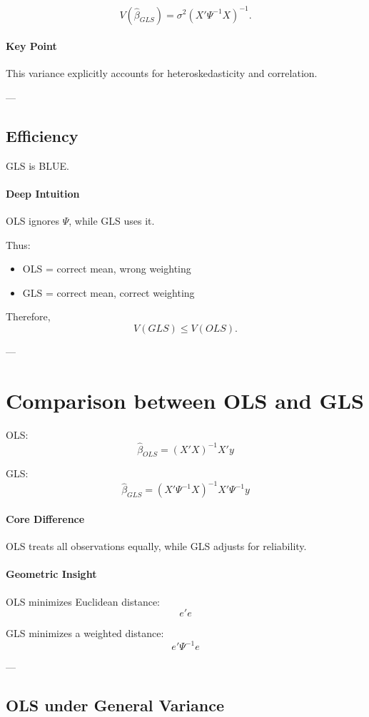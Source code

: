 \[
V(\hat{\beta}_{GLS})
=
\sigma^2 (X'\Psi^{-1}X)^{-1}.
\]

\paragraph{Key Point}
This variance explicitly accounts for heteroskedasticity and correlation.

---

\subsection{Efficiency}

GLS is BLUE.

\paragraph{Deep Intuition}
OLS ignores $\Psi$, while GLS uses it.

Thus:
\begin{itemize}
    \item OLS = correct mean, wrong weighting
    \item GLS = correct mean, correct weighting
\end{itemize}

Therefore,
\[
V(GLS) \leq V(OLS).
\]

---

\section{Comparison between OLS and GLS}

OLS:
\[
\hat{\beta}_{OLS}=(X'X)^{-1}X'y
\]

GLS:
\[
\hat{\beta}_{GLS}=(X'\Psi^{-1}X)^{-1}X'\Psi^{-1}y
\]

\paragraph{Core Difference}
OLS treats all observations equally, while GLS adjusts for reliability.

\paragraph{Geometric Insight}
OLS minimizes Euclidean distance:
\[
e'e
\]

GLS minimizes a weighted distance:
\[
e'\Psi^{-1}e
\]

---

\subsection{OLS under General Variance}

